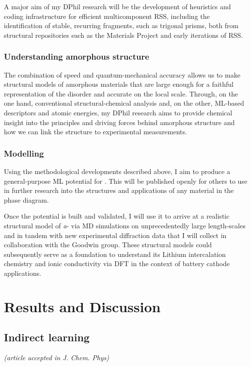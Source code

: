 \documentclass[12pt,a4paper,twoside,nobind]{ociamthesis}
\begin{document}
A major aim of my DPhil research will be the development of heuristics and coding infrastructure for efficient multicomponent RSS,
including the identification of stable, recurring fragments, such as \ce{[MoS6]} trigonal prisms, 
both from structural repositories such as the Materials Project\autocite{Jain2013} and early iterations of RSS.

\subsection*{Understanding amorphous structure}

The combination of speed and quantum-mechanical accuracy allows us to make structural models of amorphous materials that are large enough for a faithful representation of the disorder and accurate on the local scale.
Through, on the one hand, conventional structural-chemical analysis and, on the other, ML-based descriptors and atomic energies, 
my DPhil research aims to provide chemical insight into the principles and driving forces
behind amorphous structure and how we can link the structure to experimental measurements.

\subsection*{Modelling }

Using the methodological developments described above, I aim to produce a general-purpose ML potential for .
This will be published openly for others to use in further research into the structures and applications of any material in the  phase diagram.
    
Once the potential is built and validated, I will use it to arrive at a realistic structural model of \textit{a}-
via MD simulations on unprecedentedly large length-scales and in tandem with new experimental diffraction data that I will collect in collaboration with the Goodwin group.
These structural models could subsequently serve as a foundation to understand its Lithium intercalation chemistry and ionic conductivity
 via DFT in the context of battery cathode applications.

%
\chapter{Results and Discussion} \label{chap:theory}
%
\section{Indirect learning}
{\vspace{-2.2em}  \begin{flushright} \small{\emph{(article accepted in J. Chem. Phys)}\autocite{Morrow2022}} \end{flushright}}
\end{document}
